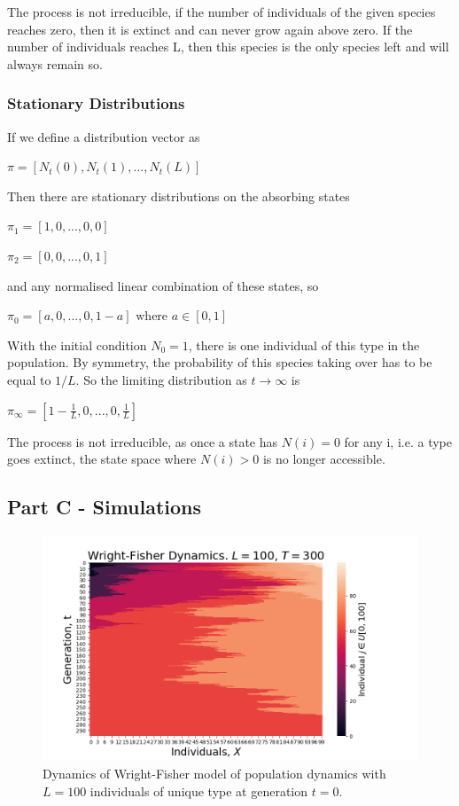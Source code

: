\documentclass{article}
\begin{document}
The process is not irreducible, if the number of individuals of the given species reaches zero, then it is extinct and can never grow again above zero. If the number of individuals reaches L, then this species is the only species left and will always remain so. 

\subsubsection{Stationary Distributions}

If we define a distribution vector as

$\pi = [N_t(0), N_t(1),...,N_t(L)]$

Then there are stationary distributions on the absorbing states

$\pi_1 = [1, 0,...,0,0]$

$\pi_2 = [0, 0,...,0,1]$

and any normalised linear combination of these states, so

$\pi_0 = [a, 0,...,0,1-a] \text{ where } a \in [0,1]$ 

With the initial condition $N_0 = 1$, there is one individual of this type in the population. By symmetry, the probability of this species taking over has to be equal to $1/L$. So the limiting distribution as $t \to \infty$ is

$\pi_{\infty} = [1-\frac{1}{L},0,...,0,\frac{1}{L}]$

The process is not irreducible, as once a state has $N(i) = 0$ for any i, i.e. a type goes extinct, the state space where $N(i) >0$ is no longer accessible.


\subsection{Part C - Simulations}

\begin{figure}[H]
\includegraphics[scale=0.6]{Wright-Fisher_a.png} 
\caption{Dynamics of Wright-Fisher model of population dynamics with $L=100$ individuals of unique type at generation $t=0$.}
\label{fig:wf_heat_full}
\end{figure}
\end{document}
